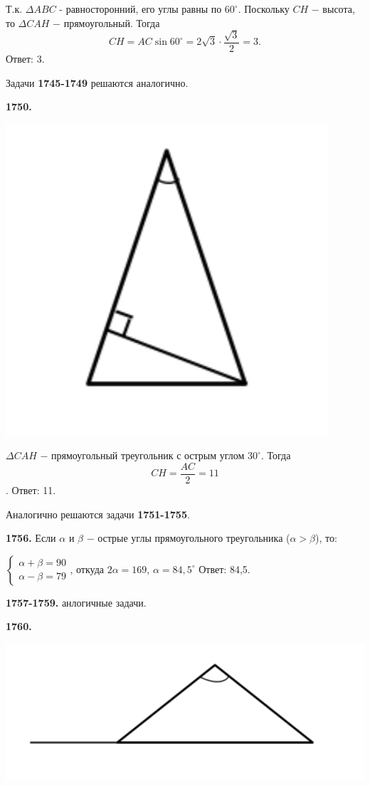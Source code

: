 Т.к. $\Delta ABC$ - равносторонний, его углы равны по $60^\circ$. Поскольку $CH$ $-$ высота, то $\Delta CAH$ $-$ прямоугольный. Тогда 
\[
CH = AC \sin{60^\circ} = 2\sqrt{3}\cdot\frac{\sqrt{3}}{2} = 3.
\] \null \hspace*{\fill} Ответ: 3.

Задачи \textbf{1745-1749} решаются аналогично.

\textbf{1750.}

{\centering \includegraphics[width=0.4\linewidth]{Geometry/Content/4.png}
	
}

$\Delta CAH$ $-$  прямоугольный треугольник с острым углом $30^\circ$. Тогда
\[
CH = \frac{AC}{2} = 11
\].\null \hspace*{\fill} Ответ: 11.

Аналогично решаются задачи \textbf{1751-1755}.

\textbf{1756.} Если $\alpha$ и $\beta$ $-$ острые углы прямоугольного треугольника ($\alpha > \beta$), то:

{\centering $
\begin{cases}
	\alpha + \beta = 90 \\
	\alpha - \beta = 79
\end{cases}
$, откуда $2\alpha = 169$, $\alpha = 84,5^\circ$ \newline \null \hspace*{\fill} Ответ: 84,5.

}

\textbf{1757-1759.} анлогичные задачи.

\textbf{1760.}

{\centering \includegraphics[width=0.6\linewidth]{Geometry/Content/5.png}

}

